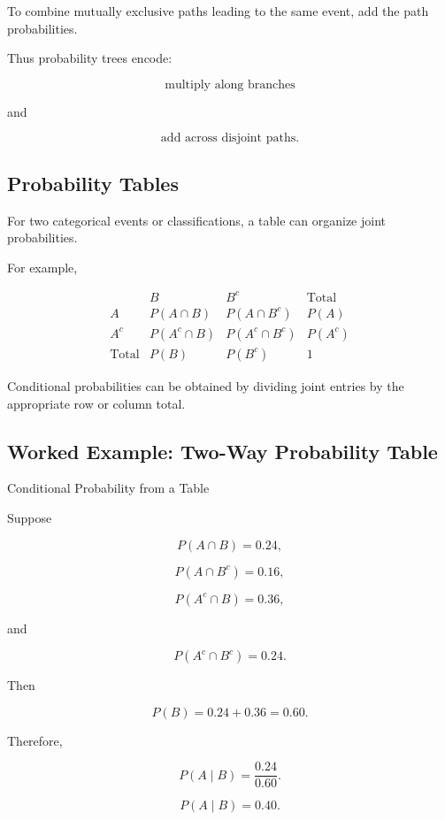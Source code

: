 To combine mutually exclusive paths leading to the same event, add the
path probabilities.

Thus probability trees encode:

\[
\boxed{
\text{multiply along branches}
}
\]

and

\[
\boxed{
\text{add across disjoint paths}.
}
\]

\subsection{Probability Tables}
\label{subsec:probability-tables}

For two categorical events or classifications, a table can organize
joint probabilities.

For example,

\[
\begin{array}{c|cc|c}
 & B & B^c & \text{Total}\\
\hline
A & P(A\cap B) & P(A\cap B^c) & P(A)\\
A^c & P(A^c\cap B) & P(A^c\cap B^c) & P(A^c)\\
\hline
\text{Total} & P(B) & P(B^c) & 1
\end{array}
\]

Conditional probabilities can be obtained by dividing joint entries by
the appropriate row or column total.

\subsection{Worked Example: Two-Way Probability Table}
\label{subsec:worked-probability-table}

\begin{workedexamplebox}{Conditional Probability from a Table}

Suppose

\[
P(A\cap B)=0.24,
\]

\[
P(A\cap B^c)=0.16,
\]

\[
P(A^c\cap B)=0.36,
\]

and

\[
P(A^c\cap B^c)=0.24.
\]

Then

\[
P(B)=0.24+0.36=0.60.
\]

Therefore,

\[
P(A\mid B)
=
\frac{0.24}{0.60}.
\]

\begin{answerbox}
\[
\boxed{
P(A\mid B)=0.40.
}
\]
\end{answerbox}

\end{workedexamplebox}

